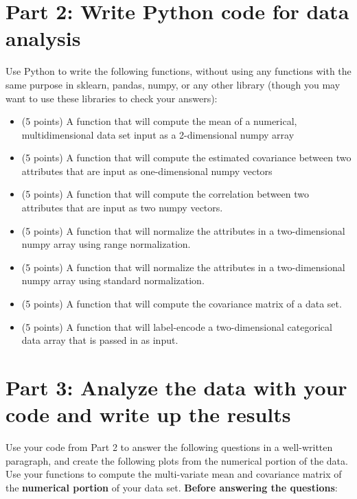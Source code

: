 \documentclass[11pt]{article}
\begin{document}
\section*{Part 2: Write Python code for data analysis}

Use Python to write the following functions, without using any functions with
the same purpose in sklearn, pandas, numpy, or any other library (though you may
want to use these libraries to check your answers):

\begin{itemize}

    \item (5 points) A function that will compute the mean of a numerical,
    multidimensional data set input as a 2-dimensional numpy array

    \item (5 points) A function that will compute the estimated covariance
    between two attributes that are input as one-dimensional numpy vectors

    \item (5 points) A function that will compute the correlation between two
    attributes that are input as two numpy vectors.

    \item (5 points) A function that will normalize the attributes in a
    two-dimensional numpy array using range normalization.

    \item (5 points) A function that will normalize the attributes in a
    two-dimensional numpy array using standard normalization.

    \item (5 points) A function that will compute the covariance matrix of a
    data set.

    \item (5 points) A function that will label-encode a two-dimensional
    categorical data array that is passed in as input.

\end{itemize}

\section*{Part 3: Analyze the data with your code and write up the results}

Use your code from Part 2 to answer the following questions in a well-written
paragraph, and create the following plots from the numerical portion of the
data. Use your functions to compute the multi-variate mean and covariance matrix
of the \textbf{numerical portion} of your data set. \textbf{Before answering the
questions}:
\end{document}
